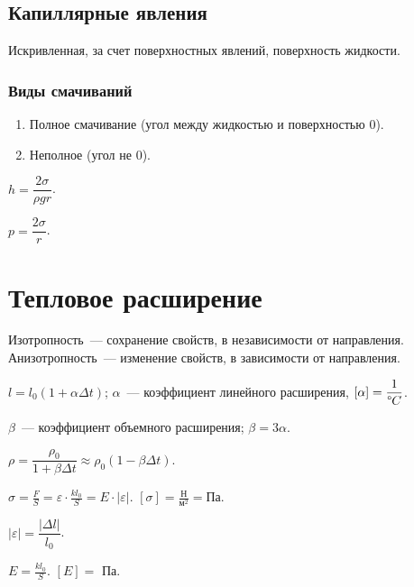 \documentclass[12pt]{article}
\begin{document}
	\subsection{Капиллярные явления}
	\begin{definition}[Мениск]
		Искривленная, за счет поверхностных явлений, поверхность жидкости.
	\end{definition}
	\subsubsection{Виды смачиваний}
	\begin{enumerate}
		\item Полное смачивание (угол между жидкостью и поверхностью $0$\textdegree).
		\item Неполное (угол не $0$\textdegree).
	\end{enumerate}
	\begin{statement}
		$h = \dfrac{2 \sigma}{\rho g r}$.
	\end{statement}
	\begin{definition}
		$p = \dfrac{2 \sigma}{r}$.
	\end{definition}
	\section{Тепловое расширение}
	\begin{definition}
		Изотропность~--- сохранение свойств, в независимости от направления. Анизотропность~--- изменение свойств, в зависимости от направления.
	\end{definition}
	\begin{definition}
		$l = l_0 (1 + \alpha \varDelta t)$; $\alpha$~--- коэффициент линейного расширения, $[\alpha] = \dfrac{1}{\text{\textdegree} C}$.
	\end{definition}
	\begin{definition}
		$\beta$~--- коэффициент объемного расширения; $\beta = 3\alpha$.
	\end{definition}
	\begin{definition}
		$\rho = \dfrac{\rho_0}{1 + \beta \varDelta t} \approx \rho_0 (1 - \beta \varDelta t)$.
	\end{definition}
	\begin{definition}
		$\sigma = \frac{F}{S} = \varepsilon \cdot \frac{kl_0}{S} = E \cdot |\varepsilon|$. $[\sigma] = \frac{\text{Н}}{\text{м}^2} = \text{Па}$.
	\end{definition}
	\begin{definition}
		$|\varepsilon| = \dfrac{|\varDelta l|}{l_0}$.
	\end{definition}
	\begin{definition}
		$E = \frac{kl_0}{S}$. $[E] =$ Па.
	\end{definition}
	
\end{document}
